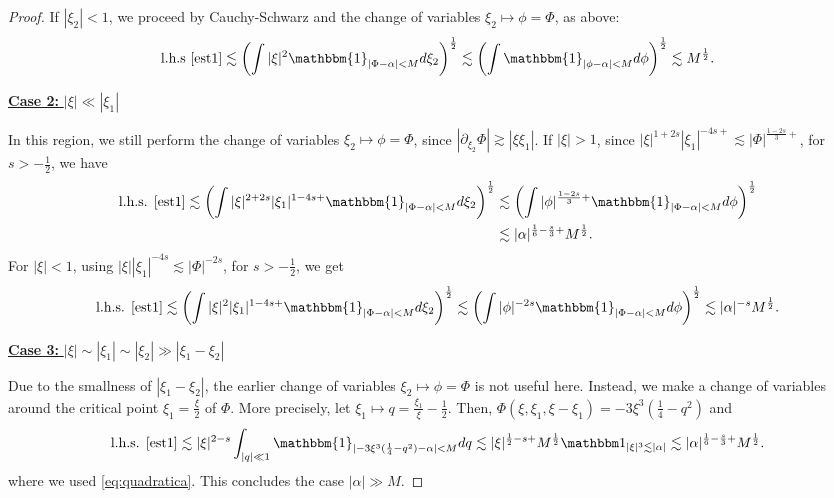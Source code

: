 \documentclass[a4paper,
11pt,  reqno]{amsart}
\newcommand{\fia}{\mathbbm{1}_{|\Phi-\alpha|<M}}
\newcommand{\5}{\textup{V}}
\newcommand{\noi}{\noindent}
\newcommand{\ind}{\mathbbm 1}
\newcommand{\les}{\lesssim}
\theoremstyle{remark}
\newcommand{\al}{\alpha}
\numberwithin{equation}{section}
\numberwithin{theorem}{section}
\begin{document}
\begin{proof}
\noi
If $|\xi_2|<1$, we proceed by Cauchy-Schwarz and the change of variables $\xi_2 \mapsto \phi= \Phi$, as above:
\begin{align*}
\text{l.h.s \eqref{est1}}
\les
\left(\int |\xi|^2\fia d\xi_2\right)^\frac12\lesssim \left(\int \mathbbm{1}_{|\phi-\alpha|<M} d\phi\right)^\frac12\lesssim M^{\frac12}.
\end{align*}

\smallskip

\noi
\underline{\textbf{Case 2:} $|\xi| \ll |\xi_1|$}

In this region, we still perform the change of variables $\xi_2\mapsto \phi=\Phi$, since $|\partial_{\xi_2}\Phi|\gtrsim |\xi\xi_1|$. If $|\xi|>1$, since $|\xi|^{1+2s}|\xi_1|^{-4s+}\lesssim |\Phi|^{\frac{1-2s}{3}+} $,  for $s>-\frac12$,  we have
\begin{align*}
\text{l.h.s. \eqref{est1}}
\lesssim \left(\int |\xi|^{2+2s}|\xi_1|^{1-4s+}\fia d\xi_2\right)^\frac12
& \lesssim \left(\int |\phi|^{\frac{1-2s}{3}+}\fia d\phi\right)^\frac12
\\
&
\lesssim |\alpha|^{\frac16 - \frac s3 +} M^{\frac12}.
\end{align*}
For $|\xi|<1$, using $|\xi||\xi_1|^{-4s}\lesssim |\Phi|^{-2s}$,  for $s>-\frac12$, we get
\begin{align*}
    \text{l.h.s. \eqref{est1}}
    \les
    \left(\int |\xi|^{2}|\xi_1|^{1-4s+}\fia d\xi_2\right)^\frac12
    \lesssim \left(\int |\phi|^{-2s}\fia d\phi\right)^\frac12\lesssim |\alpha|^{-s} M^{\frac12}.
\end{align*}



\smallskip

\noi
\underline{\textbf{Case 3:}
$|\xi|\sim|\xi_1| \sim |\xi_2| \gg |\xi_1 - \xi_2|$}




Due to the smallness of $|\xi_1-\xi_2|$,
the earlier change of variables $\xi_2\mapsto \phi = \Phi$ is not useful here.
Instead,
we make a change of variables around the critical point $\xi_1 = \frac\xi2$ of $\Phi$. More precisely, let $\xi_1 \mapsto q = \frac{\xi_1}{\xi} - \frac12$. Then, $\Phi (\xi, \xi_1,\xi-\xi_1)=  -3 \xi^3 (\frac14 - q^2)$ and
\begin{align*}
\text{l.h.s. \eqref{est1}}
\les
|\xi|^{2-s}\int_{|q| \ll 1} \mathbbm{1}_{|-3 \xi^3 (\frac14 - q^2)-\alpha|<M}dq \les |\xi|^{\frac12-s +} M^\frac12  \ind_{|\xi|^3 \les |\al|}
\les |\alpha|^{\frac16-\frac s3+} M^\frac12.
\end{align*}
where we used \eqref{eq:quadratica}.
This concludes the case $|\alpha|\gg M$.


\end{proof}
\end{document}
